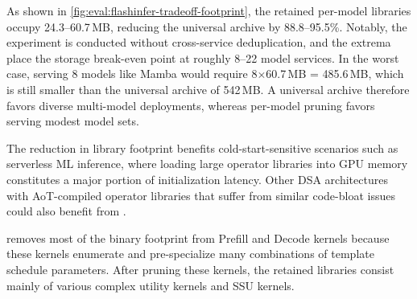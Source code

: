 As shown in \autoref{fig:eval:flashinfer-tradeoff-footprint}, the retained per-model libraries occupy 24.3--60.7\,MB, reducing the universal archive by 88.8--95.5\%.
Notably, the experiment is conducted without cross-service deduplication, and the extrema place the storage break-even point at roughly 8--22 model services.
In the worst case, serving 8 models like Mamba would require 8$\times$60.7\,MB = 485.6\,MB, which is still smaller than the universal archive of 542\,MB.
A universal archive therefore favors diverse multi-model deployments, whereas per-model pruning favors serving modest model sets.

The reduction in library footprint benefits cold-start-sensitive scenarios such as serverless ML inference, where loading large operator libraries into GPU memory constitutes a major portion of initialization latency. Other DSA architectures with AoT-compiled operator libraries that suffer from similar code-bloat issues could also benefit from \mysys.

\mysys removes most of the binary footprint from Prefill and Decode kernels because these kernels enumerate and pre-specialize many combinations of template schedule parameters. After pruning these kernels, the retained libraries consist mainly of various complex utility kernels and SSU kernels.

